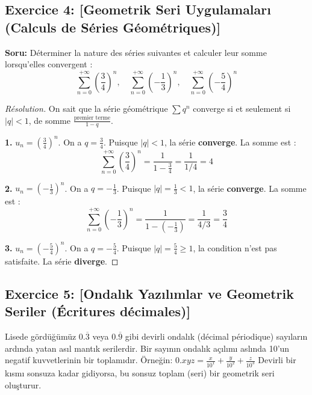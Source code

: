 \documentclass[12pt,a4paper]{report}
\begin{document}
\subsection*{Exercice 4: [Geometrik Seri Uygulamaları (Calculs de Séries Géométriques)]}

\textbf{Soru:}
Déterminer la nature des séries suivantes et calculer leur somme lorsqu'elles convergent :
\[ \sum_{n=0}^{+\infty} \left(\frac{3}{4}\right)^n, \quad \sum_{n=0}^{+\infty} \left(-\frac{1}{3}\right)^n, \quad \sum_{n=0}^{+\infty} \left(-\frac{5}{4}\right)^n \]

\begin{proof}[Résolution]
On sait que la série géométrique $\sum q^n$ converge si et seulement si $|q| < 1$, de somme $\frac{\text{premier terme}}{1-q}$.

\textbf{1.} $u_n = \left(\frac{3}{4}\right)^n$. On a $q = \frac{3}{4}$. Puisque $|q| < 1$, la série \textbf{converge}.
La somme est :
\[ \sum_{n=0}^{+\infty} \left(\frac{3}{4}\right)^n = \frac{1}{1 - \frac{3}{4}} = \frac{1}{1/4} = 4 \]

\textbf{2.} $u_n = \left(-\frac{1}{3}\right)^n$. On a $q = -\frac{1}{3}$. Puisque $|q| = \frac{1}{3} < 1$, la série \textbf{converge}.
La somme est :
\[ \sum_{n=0}^{+\infty} \left(-\frac{1}{3}\right)^n = \frac{1}{1 - (-\frac{1}{3})} = \frac{1}{4/3} = \frac{3}{4} \]

\textbf{3.} $u_n = \left(-\frac{5}{4}\right)^n$. On a $q = -\frac{5}{4}$. Puisque $|q| = \frac{5}{4} \ge 1$, la condition n'est pas satisfaite.
La série \textbf{diverge}.
\end{proof}

\subsection*{Exercice 5: [Ondalık Yazılımlar ve Geometrik Seriler (Écritures décimales)]}

\begin{tcolorbox}[colback=orange!5!white,colframe=orange!75!black,title=Hatırlatma (Rappel): Devirli Ondalık Sayılar]
Lisede gördüğümüz $0.\overline{3}$ veya $0.\overline{9}$ gibi devirli ondalık (décimal périodique) sayıların ardında yatan asıl mantık serilerdir. Bir sayının ondalık açılımı aslında 10'un negatif kuvvetlerinin bir toplamıdır.
Örneğin: $0.xyz = \frac{x}{10^1} + \frac{y}{10^2} + \frac{z}{10^3}$
Devirli bir kısmı sonsuza kadar gidiyorsa, bu sonsuz toplam (seri) bir geometrik seri oluşturur.
\end{tcolorbox}
\end{document}
